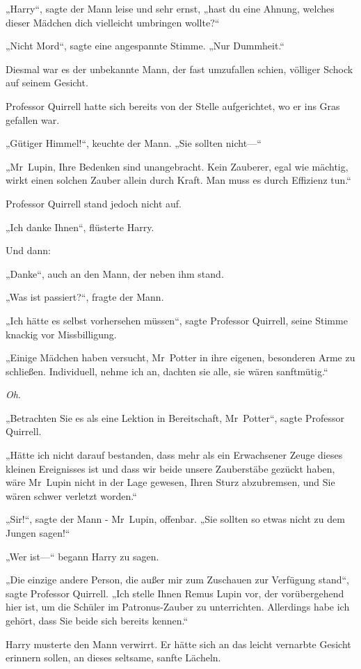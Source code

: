 {„Harry“, sagte der Mann leise und sehr ernst, „hast du eine Ahnung, welches dieser Mädchen dich vielleicht umbringen wollte?“

„Nicht Mord“, sagte eine angespannte Stimme. „Nur Dummheit.“

Diesmal war es der unbekannte Mann, der fast umzufallen schien, völliger Schock auf seinem Gesicht.

Professor Quirrell hatte sich bereits von der Stelle aufgerichtet, wo er ins Gras gefallen war.

„Gütiger Himmel!“, keuchte der Mann. „Sie sollten nicht—“

„Mr~Lupin, Ihre Bedenken sind unangebracht. Kein Zauberer, egal wie mächtig, wirkt einen solchen Zauber allein durch Kraft. Man muss es durch Effizienz tun.“

Professor Quirrell stand jedoch nicht auf.

„Ich danke Ihnen“, flüsterte Harry.

Und dann:

„Danke“, auch an den Mann, der neben ihm stand.

„Was ist passiert?“, fragte der Mann.

„Ich hätte es selbst vorhersehen müssen“, sagte Professor Quirrell, seine Stimme knackig vor Missbilligung.

„Einige Mädchen haben versucht, Mr~Potter in ihre eigenen, besonderen Arme zu schließen. Individuell, nehme ich an, dachten sie alle, sie wären sanftmütig.“

\emph{Oh}.

„Betrachten Sie es als eine Lektion in Bereitschaft, Mr~Potter“, sagte Professor Quirrell.

„Hätte ich nicht darauf bestanden, dass mehr als ein Erwachsener Zeuge dieses kleinen Ereignisses ist und dass wir beide unsere Zauberstäbe gezückt haben, wäre Mr~Lupin nicht in der Lage gewesen, Ihren Sturz abzubremsen, und Sie wären schwer verletzt worden.“

„Sir!“, sagte der Mann - Mr~Lupin, offenbar. „Sie sollten so etwas nicht zu dem Jungen sagen!“

„Wer ist—“ begann Harry zu sagen.

„Die einzige andere Person, die außer mir zum Zuschauen zur Verfügung stand“, sagte Professor Quirrell. „Ich stelle Ihnen Remus Lupin vor, der vorübergehend hier ist, um die Schüler im Patronus-Zauber zu unterrichten. Allerdings habe ich gehört, dass Sie beide sich bereits kennen.“

Harry musterte den Mann verwirrt. Er hätte sich an das leicht vernarbte Gesicht erinnern sollen, an dieses seltsame, sanfte Lächeln.

}
